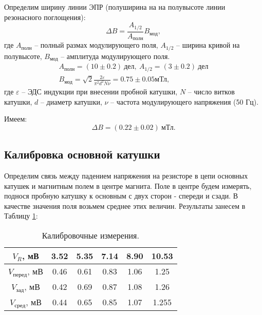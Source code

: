     Определим ширину линии ЭПР (полуширина на на полувысоте линии резонасного поглощения):
    \begin{equation*}
        \Delta B = \frac{A_{1/2}}{A_{\text{полн}}}B_\text{мод},
    \end{equation*}
    где $A_\text{полн}$ -- полный размах модулирующего поля, $A_{1/2}$ -- ширина кривой на полувысоте, $B_\text{мод}$ -- амплитуда модулирующего поля.
    \begin{equation*}
        \begin{gathered}
            A_\text{полн} = (10 \pm 0.2 ) \ \text{дел}, \ A_{1/2} = (3 \pm 0.2) \ \text{дел} \\
            B_\text{мод} = \sqrt{2} \frac{2\varepsilon}{\pi^2d^2N\nu} = 0.75\pm 0.05 \text{мТл},
        \end{gathered}
    \end{equation*}
    где $\varepsilon$ -- ЭДС индукции при внесении пробной катушки, $N$ -- число витков катушки, $d$ -- диаметр катушки, $\nu$ -- частота модулирующего напряжения (50 Гц).
    
    Имеем:
    \[\boxed{\Delta B = (0.22 \pm 0.02) \ \text{мТл}}.\]
    
    \subsection*{Калибровка основной катушки}
    
    Определим связь между падением напряжения на резисторе в цепи основных катушек и магнитным полем в центре магнита. Поле в центре будем измерять, поднося пробную катушку к основным с двух сторон - спереди и сзади. 
    В качестве значения поля возьмем среднее этих величин. Результаты занесем в Таблицу \ref{table:field}: 
    
    \begin{table}[h]
    \centering
        \begin{tabular}{|c|c|c|c|c|c|}
        \hline
        $V_R$, мВ              & 3.52 & 5.35 & 7.14 & 8.90 & 10.53 \\ \hline
        $V_{\text{перед}}$, мВ & 0.46 & 0.61 & 0.83 & 1.06 & 1.25  \\ \hline
        $V_{\text{зад}}$, мВ   & 0.42 & 0.69 & 0.87 & 1.08 & 1.26  \\ \hline
        $V_{\text{сред}}$, мВ  & 0.44 & 0.65 & 0.85 & 1.07 & 1.255 \\ \hline
        \end{tabular}
    \caption{Калибровочные измерения.}
    \label{table:field}
    \end{table}
    
